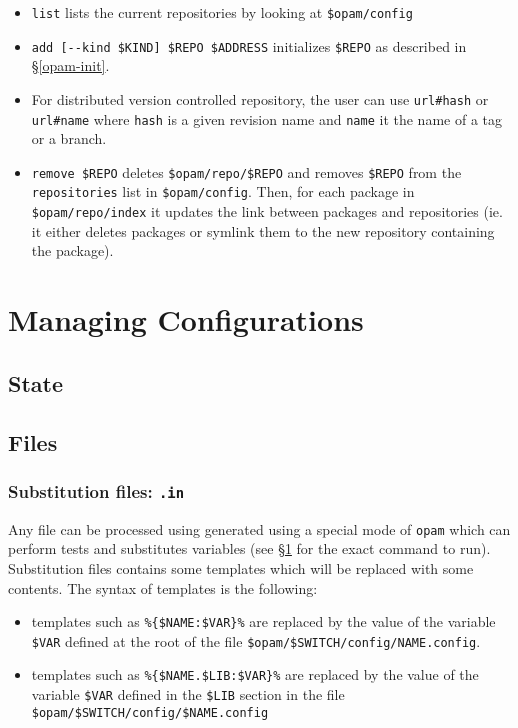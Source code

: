 \documentclass[a4paper,10pt]{article}
\begin{document}
\begin{itemize}
\item \verb+list+ lists the current repositories by looking at
  \verb+$opam/config+

\item \verb+add [--kind $KIND] $REPO $ADDRESS+ initializes
  \verb+$REPO+ as described in \S\ref{opam-init}.

\item For distributed version controlled repository, the user can use
  \verb+url#hash+ or \verb+url#name+ where {\tt hash} is a given
  revision name and {\tt name} it the name of a tag or a branch.

\item \verb+remove $REPO+ deletes \verb+$opam/repo/$REPO+ and removes
  \verb+$REPO+ from the {\tt repositories} list in \verb+$opam/config+.
  Then, for each package in \verb+$opam/repo/index+ it updates the link
  between packages and repositories (ie. it either deletes packages or
  symlink them to the new repository containing the package).

\end{itemize}

\section{Managing Configurations}
\label{section:config}

\subsection{State}

\subsection{Files}

\subsubsection{Substitution files: {\tt *.in}}
\label{file:subst}

Any file can be processed using generated using a special mode of
{\tt opam} which can perform tests and substitutes variables (see
\S\ref{section:config} for the exact command to run). Substitution files
contains some templates which will be replaced with some contents. The
syntax of templates is the following:

\begin{itemize}

\item templates such as \verb+%{$NAME:$VAR}%+ are replaced by the value
  of the variable \verb+$VAR+ defined at the root of the file
  \verb+$opam/$SWITCH/config/NAME.config+.

\item templates such as \verb+%{$NAME.$LIB:$VAR}%+ are replaced by the
  value of the variable \verb+$VAR+ defined in the \verb+$LIB+ section
  in the file \verb+$opam/$SWITCH/config/$NAME.config+

\end{itemize}
\end{document}
